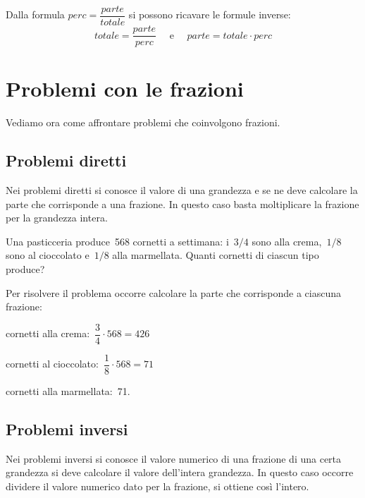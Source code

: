 Dalla formula \(perc = \dfrac{parte}{totale}\) si possono ricavare le 
formule inverse: 
\[totale = \dfrac{parte}{perc} \quad \text{ e } \quad 
  parte = totale \cdot perc\]


\section{Problemi con le frazioni}
\label{sec:razionali_problemi}

Vediamo ora come affrontare problemi che coinvolgono frazioni.

\subsection{Problemi diretti}
Nei problemi diretti si conosce il valore di una grandezza e se ne deve 
calcolare la parte che corrisponde a una frazione. 
In questo caso basta moltiplicare la frazione per la grandezza intera.

\begin{exrig}
 \begin{esempio}
Una pasticceria produce~568 cornetti a settimana: i~\(3/4\) sono alla 
crema,~\(1/8\) sono al cioccolato e~\(1/8\) alla marmellata. 
Quanti cornetti di ciascun tipo produce?

Per risolvere il problema occorre calcolare la parte che corrisponde a 
ciascuna frazione:

\begin{itemize*}
\item cornetti alla crema:~\(\dfrac{3}{4}\cdot 568 =426\)
\item cornetti al cioccolato:~\(\dfrac{1}{8}\cdot 568 =71\)
\item cornetti alla marmellata:~71.
\end{itemize*}
 \end{esempio}
\end{exrig}

\subsection{Problemi inversi}

Nei problemi inversi si conosce il valore numerico di una frazione di una 
certa grandezza si deve calcolare il valore dell'intera grandezza.
In questo caso occorre dividere il valore numerico dato per la frazione, 
si ottiene così l'intero.

